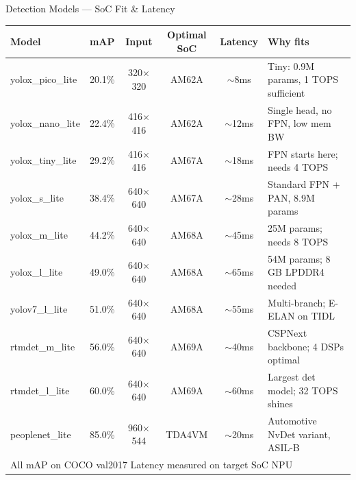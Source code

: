 \documentclass[aspectratio=169]{beamer}
\begin{document}
\begin{frame}{Detection Models --- SoC Fit \& Latency}
\small
\begin{tabular}{lccccl}
\toprule
\textbf{Model} & \textbf{mAP} & \textbf{Input} & \textbf{Optimal SoC} & \textbf{Latency} & \textbf{Why fits}\\
\midrule
yolox\_pico\_lite & 20.1\% & 320$\times$320 & AM62A  & $\sim$8ms  & Tiny: 0.9M params, 1 TOPS sufficient\\
yolox\_nano\_lite & 22.4\% & 416$\times$416 & AM62A  & $\sim$12ms & Single head, no FPN, low mem BW\\
yolox\_tiny\_lite & 29.2\% & 416$\times$416 & AM67A  & $\sim$18ms & FPN starts here; needs 4 TOPS\\
yolox\_s\_lite    & 38.4\% & 640$\times$640 & AM67A  & $\sim$28ms & Standard FPN + PAN, 8.9M params\\
yolox\_m\_lite    & 44.2\% & 640$\times$640 & AM68A  & $\sim$45ms & 25M params; needs 8 TOPS\\
yolox\_l\_lite    & 49.0\% & 640$\times$640 & AM68A  & $\sim$65ms & 54M params; 8 GB LPDDR4 needed\\
yolov7\_l\_lite   & 51.0\% & 640$\times$640 & AM68A  & $\sim$55ms & Multi-branch; E-ELAN on TIDL\\
rtmdet\_m\_lite   & 56.0\% & 640$\times$640 & AM69A  & $\sim$40ms & CSPNext backbone; 4 DSPs optimal\\
rtmdet\_l\_lite   & 60.0\% & 640$\times$640 & AM69A  & $\sim$60ms & Largest det model; 32 TOPS shines\\
peoplenet\_lite   & 85.0\% & 960$\times$544 & TDA4VM & $\sim$20ms & Automotive NvDet variant, ASIL-B\\
\midrule
\multicolumn{6}{l}{\footnotesize All mAP on COCO val2017 \quad Latency measured on target SoC NPU}
\end{tabular}
\end{frame}
\end{document}
